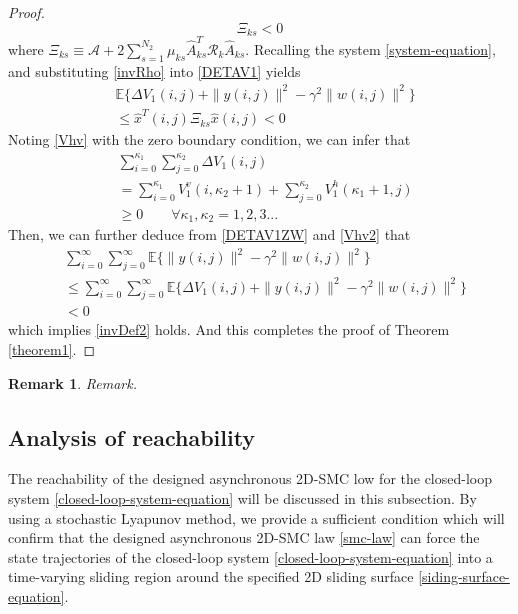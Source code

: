 \documentclass[conference]{IEEEtran}
\newtheorem{remark}{Remark}
\begin{document}
\begin{proof}
	\begin{equation}\label{T1P4}
	\mathcal{\varXi}_{ks}<0
	\end{equation}	
	where $\mathcal{\varXi}_{ks} \equiv \mathcal{A} +2\sum_{s=1}^{N_{2}}\mu_{ks}\hat{A}^{T}_{ks}\mathcal{R}_{k}\hat{A}_{ks}$. 
	Recalling the system \eqref{system-equation}, and substituting \eqref{invRho} into \eqref{DETAV1} yields
	\begin{equation}\label{DETAV1ZW}
		\begin{split}
			&\mathbb{E}\{\varDelta V_{1}(i,j)+\|y(i,j)\|^{2}-\gamma^{2}\|w(i,j)\|^{2}  \}\\
			&\leq \hat{x}^{T}(i,j)\mathcal{\varXi}_{ks} \hat{x}(i,j)<0
		\end{split}
	\end{equation}
	Noting \eqref{Vhv} with the zero boundary condition, we can infer that
	\begin{equation} \label{Vhv2}
	\begin{split}
	&\sum_{i=0}^{\kappa_{1}}\sum_{j=0}^{\kappa_{2}}  \varDelta V_{1}(i,j)\\
	&=\sum_{i=0}^{\kappa_{1}}V^{v}_{1}(i,\kappa_{2}+1) + \sum_{j=0}^{\kappa_{2}}V^{h}_{1}(\kappa_{1}+1,j) \\
	&\geq 0 \qquad \forall \kappa_{1},\kappa_{2} = 1,2,3...
	\end{split}
	\end{equation}
	Then, we can further deduce from \eqref{DETAV1ZW} and \eqref{Vhv2} that 
	\begin{equation}\label{DETAV1ZW2}
	\begin{split}
	&\sum_{i=0}^{\infty}\sum_{j=0}^{\infty}  \mathbb{E}\{\|y(i,j)\|^{2}-\gamma^{2}\|w(i,j)\|^{2}  \}\\
	&\leq \sum_{i=0}^{\infty}\sum_{j=0}^{\infty}  \mathbb{E}\{\varDelta V_{1}(i,j)+\|y(i,j)\|^{2}-\gamma^{2}\|w(i,j)\|^{2}  \}  \\
	&< 0
	\end{split}
	\end{equation}
	which implies \eqref{invDef2} holds. And this completes the proof of Theorem \ref{theorem1}.
	
	
\end{proof}


\begin{remark}
	Remark.
\end{remark}


\subsection{Analysis of reachability}\label{minimization} 
	 The reachability of the  designed asynchronous 2D-SMC low for the closed-loop system \eqref{closed-loop-system-equation} will be discussed in this subsection. By using a stochastic Lyapunov method, we provide a sufficient condition which will confirm that the designed asynchronous 2D-SMC law \eqref{smc-law} can force the state trajectories of the closed-loop system \eqref{closed-loop-system-equation} into a time-varying sliding region around the specified 2D sliding surface \eqref{siding-surface-equation}.
	 
\end{document}
